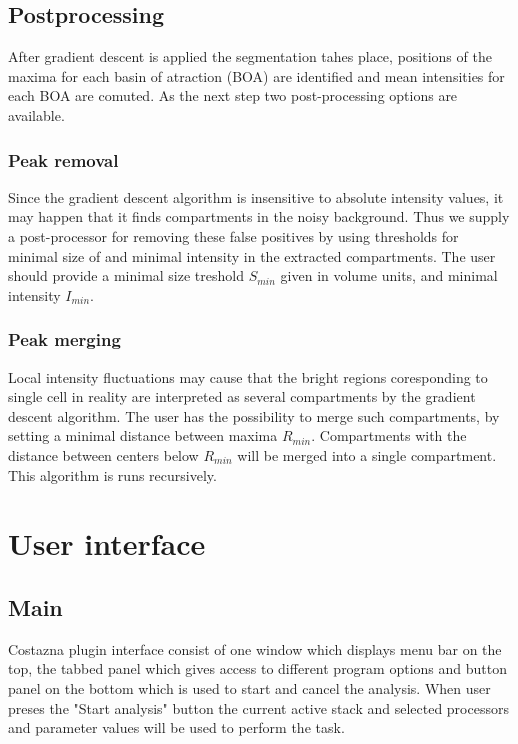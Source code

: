 \documentclass[a4paper,12pt]{article}
\begin{document}
\subsection{Postprocessing}

After gradient descent is applied the segmentation tahes place, positions of the maxima for each basin of atraction (BOA) are  identified and mean intensities for each BOA are comuted. As the next step two post-processing options
are available.

\subsubsection{Peak removal}

Since the gradient descent algorithm is insensitive to absolute intensity
values, it may happen that it finds compartments in the noisy
background. Thus we supply a post-processor for removing these false positives by
using thresholds for minimal size of and minimal intensity in the extracted
compartments. The user should provide a minimal size treshold $S_{min}$ given in volume
units, and minimal intensity $I_{min}$.

\subsubsection{Peak merging}

Local intensity fluctuations may cause that the bright regions coresponding to single cell in reality
are interpreted as several
compartments by the gradient descent algorithm. The user has the possibility
to merge such compartments, by setting a minimal distance between maxima
$R_{min}$. Compartments with the distance between centers below $R_{min}$ will be
merged into a single compartment. This algorithm is runs recursively.

\section{User interface}

\subsection{Main}

Costazna plugin interface consist of one window which displays menu bar on the top, the tabbed panel which gives access to different program options and button panel on the bottom which is used to start and cancel the analysis. When user preses the "Start analysis" button the current active stack and selected processors and parameter values will be used to perform the task.
 
\end{document}
